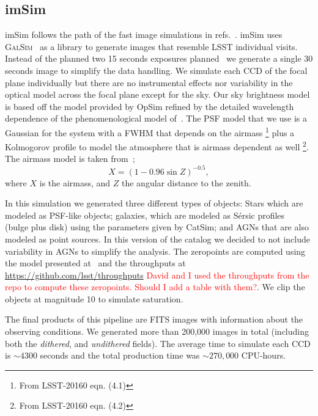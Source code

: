 \documentclass[\docopts]{\docclass}
\begin{document}
\subsection{imSim}
\label{sec:imsim_pipeline}

imSim follows the path of the fast image simulations in refs.~\citep{2016MNRAS.457..786S,2016ApJ...817...25B}.
imSim uses \textsc{GalSim}~\citep{2015A&C....10..121R} as a library to generate images that resemble LSST individual visits. Instead of the
planned two 15 seconds exposures planned~\citep{2008arXiv0805.2366I} we generate a single 30 seconds image to simplify the data handling.
We simulate each CCD of the focal plane individually but there are no instrumental effects nor variability in the optical model
across the focal plane except for the sky.  Our sky brightness model is based off the \citet{1991PASP..103.1033K} model provided by OpSim refined by the detailed wavelength dependence of the phenomenological model of~\citet{2016SPIE.9910E..1AY}. The PSF model that we use is a Gaussian for the system with a FWHM that depends on the airmass
\footnote{From LSST-20160 eqn. (4.1)} plus a Kolmogorov profile to model the atmosphere that is airmass dependent as well
\footnote{From LSST-20160 eqn. (4.2)}. The airmass model is taken from~\citep{1991PASP..103.1033K};
\begin{equation}
X = (1 - 0.96\sin{Z})^{-0.5},
\end{equation}
where $X$ is the airmass, and $Z$ the angular distance to the zenith.

In this simulation we generated three different types of objects: Stars which are modeled as PSF-like objects; galaxies, which are modeled as S\'{e}rsic profiles~\citep{1963BAAA....6...41S} (bulge plus disk) using
the parameters given by CatSim; and AGNs that are also modeled as point sources. In this version of the catalog we decided
to not include variability in AGNs to simplify the analysis. The zeropoints are computed using the model presented at~\citep{2008arXiv0805.2366I} and the
throughputs at \url{https://github.com/lsst/throughputs} \textcolor{red}{David and I used the throughputs from the repo to compute these zeropoints. Should I add a table with them?}. We clip the objects at magnitude 10 to simulate saturation.

The final products of this pipeline are FITS images with information about the observing conditions. We generated more than 200,000 images in total (including both the \textit{dithered}, and \textit{undithered} fields). The average time to simulate each CCD is $\sim 4300$ seconds and the total production time was $\sim 270,000$ CPU-hours.
\end{document}
